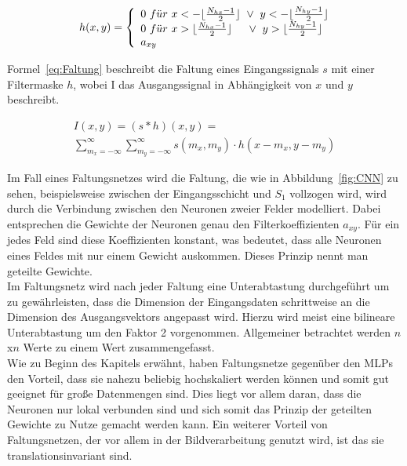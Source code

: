\documentclass[times, 11pt,twocolumn]{article}
\begin{document}
\footnotesize
\begin{equation} 
	h(x,y) = \left\lbrace
  \begin{array}{l@{}l}
   0~f\ddot{u}r~x<-\lfloor\frac{N_{hx}-1}{2}\rfloor~\vee~y<-\lfloor\frac{N_{hy}-1}{2}\rfloor\\
    0~f\ddot{u}r~x>\lfloor\frac{N_{hx}-1}{2}\rfloor~~~~\vee~y>\lfloor\frac{N_{hy}-1}{2}\rfloor \\
    a_{xy}
  \end{array}
  \right.	
	\label{eq:Filtermaske}
\end{equation}
\small  

Formel~\ref{eq:Faltung} beschreibt die Faltung eines Eingangssignals $s$ mit einer Filtermaske $h$, wobei I das Ausgangssignal in Abhängigkeit von $x$ und $y$ beschreibt.

\footnotesize
\begin{equation}
\begin{aligned}
I(x,y) = (s*h)(x,y) = \\
\sum_{m_x=-\infty}^\infty \sum_{m_y=-\infty}^\infty s(m_x,m_y) \cdot h(x-m_x,y-m_y) 
\end{aligned}
	\label{eq:Faltung}
\end{equation}
\small

Im Fall eines Faltungsnetzes wird die Faltung, die wie in Abbildung~\ref{fig:CNN} zu sehen, beispielsweise zwischen der Eingangsschicht und $S_1$ vollzogen wird, wird durch die Verbindung zwischen den Neuronen zweier Felder modelliert. Dabei entsprechen die Gewichte der Neuronen genau den Filterkoeffizienten $a_{xy}$. Für ein jedes Feld sind diese Koeffizienten konstant, was bedeutet, dass alle Neuronen eines Feldes mit nur einem Gewicht auskommen. Dieses Prinzip nennt man geteilte Gewichte. \\

Im Faltungsnetz wird nach jeder Faltung eine Unterabtastung durchgeführt um zu gewährleisten, dass die Dimension der Eingangsdaten schrittweise an die Dimension des Ausgangsvektors angepasst wird. Hierzu wird meist eine bilineare Unterabtastung um den Faktor 2 vorgenommen. Allgemeiner betrachtet werden $n$x$n$ Werte zu einem Wert zusammengefasst.\\

Wie zu Beginn des Kapitels erwähnt, haben Faltungsnetze gegenüber den MLPs den Vorteil, dass sie nahezu beliebig hochskaliert werden können und somit gut geeignet für große Datenmengen sind. Dies liegt vor allem daran, dass die Neuronen nur lokal verbunden sind und sich somit das Prinzip der geteilten Gewichte zu Nutze gemacht werden kann. Ein weiterer Vorteil von Faltungsnetzen, der vor allem in der Bildverarbeitung genutzt wird, ist das sie translationsinvariant sind.
\end{document}
